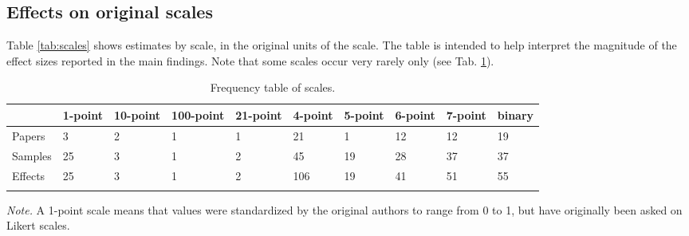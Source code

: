 \documentclass[
  doc,floatsintext]{apa6}
\begin{document}
\subsection{Effects on original scales}\label{effects-on-original-scales}

Table \ref{tab:scales} shows estimates by scale, in the original units of the scale. The table is intended to help interpret the magnitude of the effect sizes reported in the main findings. Note that some scales occur very rarely only (see Tab. \ref{tab:n-scales}).

\begin{table}[tbp]

\begin{center}
\begin{threeparttable}

\caption{\label{tab:n-scales}Frequency table of scales.}

\begin{tabular}{llllllllll}
\toprule
 & \multicolumn{1}{c}{1-point} & \multicolumn{1}{c}{10-point} & \multicolumn{1}{c}{100-point} & \multicolumn{1}{c}{21-point} & \multicolumn{1}{c}{4-point} & \multicolumn{1}{c}{5-point} & \multicolumn{1}{c}{6-point} & \multicolumn{1}{c}{7-point} & \multicolumn{1}{c}{binary}\\
\midrule
Papers & 3 & 2 & 1 & 1 & 21 & 1 & 12 & 12 & 19\\
Samples & 25 & 3 & 1 & 2 & 45 & 19 & 28 & 37 & 37\\
Effects & 25 & 3 & 1 & 2 & 106 & 19 & 41 & 51 & 55\\
\bottomrule
\addlinespace
\end{tabular}

\begin{tablenotes}[para]
\normalsize{\textit{Note.} A 1-point scale means that values were standardized by the original authors to range from 0 to 1, but have originally been asked on Likert scales.}
\end{tablenotes}

\end{threeparttable}
\end{center}

\end{table}
\end{document}
